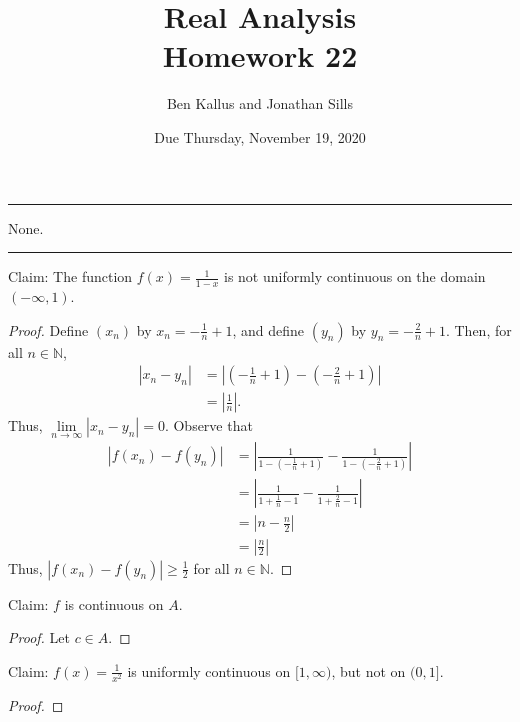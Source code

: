 \documentclass[12pt]{article}
\title{Real Analysis \\ Homework 22}
\author{Ben Kallus and Jonathan Sills}
\date{Due Thursday, November 19, 2020}
\begin{document}
\pagecolor{black}
\color{white}
\maketitle

\hrule
\bigskip

 None.

\bigskip
\hrule
\bigskip


\medskip
{} Claim: The function $f(x) = \frac1{1-x}$ is not uniformly continuous on the domain $(-\infty, 1)$.
\begin{proof}
    Define $(x_n)$ by $x_n = -\frac1{n} + 1$, and define $(y_n)$ by $y_n = -\frac2{n} + 1$. Then, for all $n \in \mathbb N$,
    \begin{align*}
        |x_n - y_n| &= \left|\left(-\frac1{n} + 1\right) - \left(-\frac2{n} + 1\right)\right| \\
                    &= \left|\frac1n\right|.
    \end{align*}
    Thus, $\lim\limits_{n \to \infty} |x_n - y_n| = 0$. Observe that
    \begin{align*}
        |f(x_n) - f(y_n)| &= \left| \frac1{1-\left(-\frac1{n} + 1\right)} - \frac1{1-\left(-\frac2{n} + 1\right)} \right| \\
                          &= \left| \frac1{1 + \frac1{n} - 1} - \frac1{1 + \frac2{n} - 1} \right| \\
                          &= \left| n - \frac n2 \right| \\
                          &= \left| \frac n2 \right|
    \end{align*}
    Thus, $|f(x_n) - f(y_n)| \geq \frac12$ for all $n \in \mathbb N$.
\end{proof}

\medskip
{} Claim: $f$ is continuous on $A$.
\begin{proof}
    Let $c \in A$. 
\end{proof}

\newpage
{} Claim: $f(x) = \frac1{x^2}$ is uniformly continuous on $[1,\infty)$, but not on $(0,1]$.
\begin{proof}
    
\end{proof}
\end{document}
